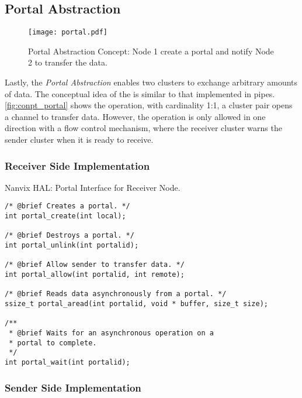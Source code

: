 		\subsection{Portal Abstraction}
		\label{sec.portal-abs}

			\begin{figure}[!tb]
				\centering%
				\caption{Portal Abstraction Concept: Node 1 create a portal and notify Node 2 to transfer the data.}%
				\label{fig:conpt_portal}%
				\texttt{[image: portal.pdf]}%
			\end{figure}


			Lastly, the \textit{Portal Abstraction} enables two clusters to exchange arbitrary
			amounts of data.
			The conceptual idea of the \portal is similar to that implemented in \posix pipes.
			\autoref{fig:conpt_portal} shows the \portal operation, with cardinality
			1:1, a cluster pair opens a channel to transfer data.
			However, the operation is only allowed in one direction with a flow control mechanism,
			where the receiver cluster warns the sender cluster when it is ready to receive.

			\subsubsection{Receiver Side Implementation}

\begin{listing}[!tb]
\caption{Nanvix HAL: Portal Interface for Receiver Node.}
\label{code:hal-portal-receiver}
\begin{verbatim}
/* @brief Creates a portal. */
int portal_create(int local);

/* @brief Destroys a portal. */
int portal_unlink(int portalid);

/* @brief Allow sender to transfer data. */
int portal_allow(int portalid, int remote);

/* @brief Reads data asynchronously from a portal. */
ssize_t portal_aread(int portalid, void * buffer, size_t size);

/**
 * @brief Waits for an asynchronous operation on a
 * portal to complete.
 */
int portal_wait(int portalid);
\end{verbatim}
\end{listing}

			\subsubsection{Sender Side Implementation}

